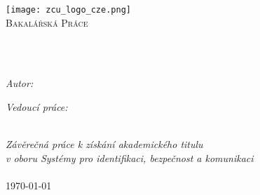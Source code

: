 \frontmatter %

\pagestyle{plain} %


\begin{titlepage}
\begin{center}
\texttt{[image: zcu\_logo\_cze.png]} %
\\\vspace{3cm}
\textsc{\Large Bakalářská Práce}\\[0.2cm] 	 %

\HRule \\[0.4cm] %
{\huge \bfseries \ttitle\par}\vspace{0.4cm} %
\HRule \\[1.5cm] %
 
\begin{minipage}[t]{0.45\textwidth}
\begin{flushleft} \large
\emph{Autor:}\\{\authorname}
\end{flushleft}
\end{minipage}
\begin{minipage}[t]{0.45\textwidth}
\begin{flushright} \large
\emph{Vedoucí práce:} \\
\href{http://www.kky.zcu.cz/cs/people/bulin-martin}{\supname}
\end{flushright}
\end{minipage}\\[2.5cm]
 
\large \textit{Závěrečná práce k získání akademického titulu  \degreename} \\[0.3cm] %
\textit{v oboru Systémy pro identifikaci, bezpečnost a komunikaci}\\[0.4cm]

\deptname %
 \\\vspace{2cm}
{\large \today} 
 
\vfill
\end{center}
\end{titlepage}